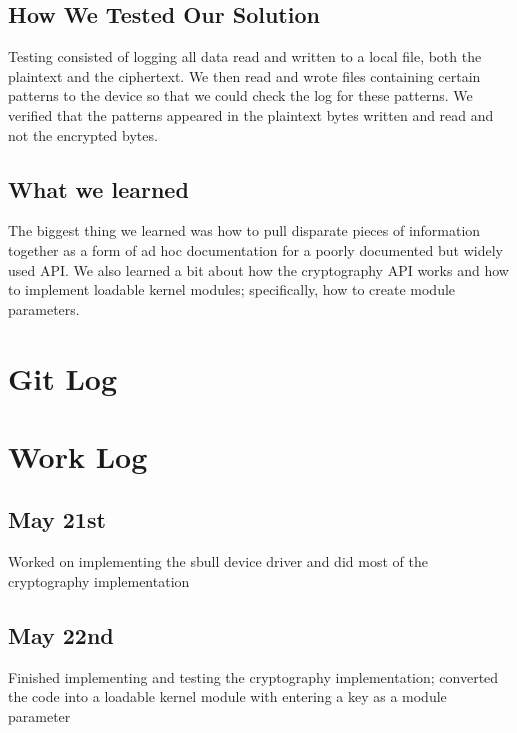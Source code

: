 \documentclass[10pt,onecolumn,journal,draftclsnofoot,letterpaper]{IEEEtran}
\begin{document}
\subsection{How We Tested Our Solution}
Testing consisted of logging all data read and written to a local file, both the plaintext and the ciphertext. We then read and wrote files containing certain patterns to the device so that we could check the log for these patterns. We verified that the patterns appeared in the plaintext bytes written and read and not the encrypted bytes.

\subsection{What we learned}
The biggest thing we learned was how to pull disparate pieces of information together as a form of ad hoc documentation for a poorly documented but widely used API. We also learned a bit about how the cryptography API works and how to implement loadable kernel modules; specifically, how to create module parameters.


\section{Git Log}



\section{Work Log}
\subsection{May 21st}
Worked on implementing the sbull device driver and did most of the cryptography implementation

\subsection{May 22nd}
Finished implementing and testing the cryptography implementation; converted the code into a loadable kernel module with entering a key as a module parameter
\end{document}
